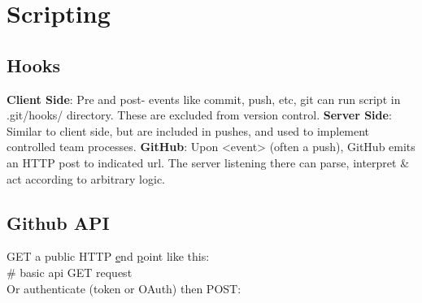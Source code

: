 \section{Scripting}

\subsection*{Hooks}
{\footnotesize 
\textbf{Client Side}: Pre and post- events like commit, push, etc, git can run script in .git/hooks/ directory.  These are excluded from version control. \textbf{Server Side}: Similar to client side, but are included in pushes, and used to implement controlled team processes.
\textbf{GitHub}: Upon <event> (often a push), GitHub emits an HTTP post to indicated url.  The server listening there can parse, interpret \& act according to arbitrary logic. 
}

\subsection*{Github API}
GET a public HTTP \underline{e}nd \underline{p}oint like this:\\
 \# basic api GET request \\
Or authenticate (token or OAuth) then POST: \\
\\
\phantom{xxxx} \\
\phantom{xxxx}  

\begin{comment}
Top level end-points:
\begin{multicols}{2}
\scriptsize
\begin{itemize}
    \item activity
    \item data
    \item gists
    \item actions
    \item interactions
    \item issues
    \item organizations
    \item projects
    \item PRs
    \item reactions
    \item teams
    \item users
\end{itemize}
\end{multicols}
\end{comment}
\ \\
